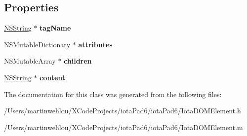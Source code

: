 \subsection*{Properties}
\begin{DoxyCompactItemize}
\item 
\hypertarget{interface_iota_d_o_m_element_a6ce95735eb8ad8b4bda7237727620334}{
\hyperlink{class_n_s_string}{NSString} $\ast$ {\bfseries tagName}}
\label{interface_iota_d_o_m_element_a6ce95735eb8ad8b4bda7237727620334}

\item 
\hypertarget{interface_iota_d_o_m_element_a7c9f0b187654e719858319233d23a667}{
NSMutableDictionary $\ast$ {\bfseries attributes}}
\label{interface_iota_d_o_m_element_a7c9f0b187654e719858319233d23a667}

\item 
\hypertarget{interface_iota_d_o_m_element_a5682f133deb42c05a40d56607feb87cd}{
NSMutableArray $\ast$ {\bfseries children}}
\label{interface_iota_d_o_m_element_a5682f133deb42c05a40d56607feb87cd}

\item 
\hypertarget{interface_iota_d_o_m_element_acbc6b2f1a3bdaa46a9057271e4257f97}{
\hyperlink{class_n_s_string}{NSString} $\ast$ {\bfseries content}}
\label{interface_iota_d_o_m_element_acbc6b2f1a3bdaa46a9057271e4257f97}

\end{DoxyCompactItemize}


The documentation for this class was generated from the following files:\begin{DoxyCompactItemize}
\item 
/Users/martinwehlou/XCodeProjects/iotaPad6/iotaPad6/IotaDOMElement.h\item 
/Users/martinwehlou/XCodeProjects/iotaPad6/iotaPad6/IotaDOMElement.m\end{DoxyCompactItemize}
